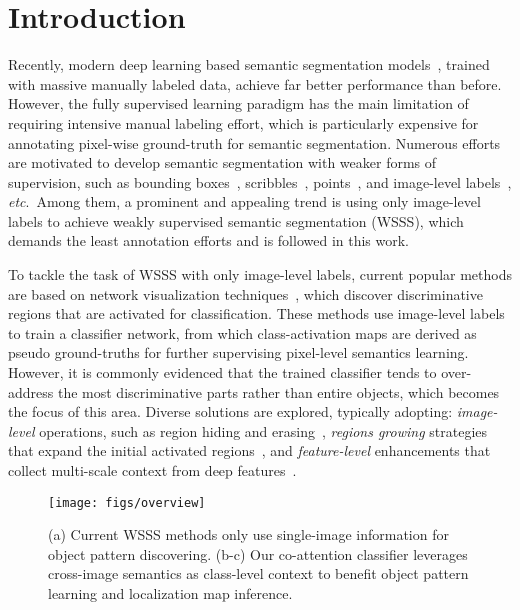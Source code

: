 \documentclass[runningheads]{llncs}
\newcommand{\etc}{\textit{etc}.}
\begin{document}
\let\thefootnote\relax{}
\section{Introduction}
Recently, modern deep learning based semantic segmentation models\!~\cite{chen2017deeplab,deeplabv3plus2018}, trained with massive manually labeled data, achieve far better performance than before.
However, the fully supervised learning paradigm has the main limitation of requiring intensive manual labeling effort, which is particularly expensive for annotating pixel-wise ground-truth for semantic segmentation. Numerous efforts are motivated to develop semantic segmentation with weaker forms of supervision, such as bounding boxes\!~\cite{papandreou2015weakly}, scribbles\!~\cite{lin2016scribblesup},  points\!~\cite{bearman2016s}, and image-level labels\!~\cite{pathak2014fully}, \etc ~Among them, a prominent and appealing trend is using only image-level labels to achieve weakly supervised semantic segmentation (WSSS), which demands the least annotation efforts and is followed in this work.

To tackle the task of WSSS with only image-level labels, current popular methods are based on network visualization techniques\!~\cite{zeiler2014visualizing,cam2016learning}, which discover discriminative regions that are activated for classification. These methods use image-level labels to train a classifier network, from which class-activation maps are derived as pseudo ground-truths for further supervising pixel-level semantics learning. However, it is commonly evidenced that the trained classifier tends to over-address the most discriminative parts rather than entire objects, which becomes the focus of this area. Diverse solutions are explored, typically adopting: \textit{image-level} operations, such as region hiding and erasing\!~\cite{kumar2017hide,wei2017object}, \textit{regions growing} strategies that expand the initial activated regions\!~\cite{sec2016,wang2018weakly}, and \textit{feature-level} enhancements that collect multi-scale context from deep features\!~\cite{wei2018revisiting,lee2018robust}.


\begin{figure}[t]
\centering
      \texttt{[image: figs/overview]}
\vspace{-3pt}
\captionsetup{font=small}
\caption{\small{(a) Current WSSS methods only use single-image information for object pattern discovering. (b-c) Our co-attention classifier leverages cross-image semantics as class-level context to benefit object pattern learning and localization map inference.
}
}
\label{fig:overview}
\vspace{-12pt}
\end{figure}
\end{document}
